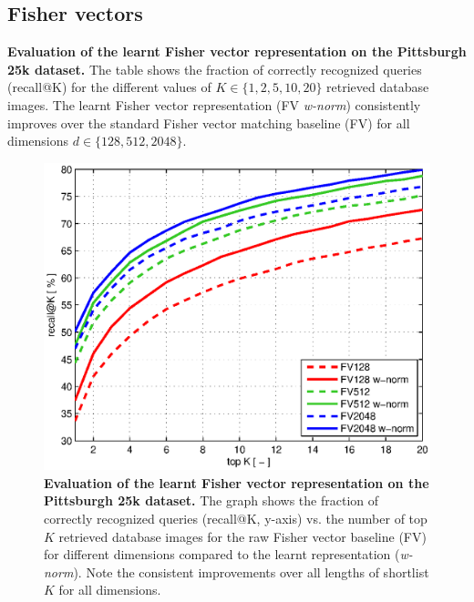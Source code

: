   \subsection{Fisher vectors}
  \label{sec:fisher_restuls}
  
    \begin{table}[tbp]
      \begin{centering}
        
        \caption{ 
          \textbf{Evaluation of the learnt Fisher vector representation on the Pittsburgh 25k \cite{Gronat13} dataset.}
           The table shows the fraction of correctly recognized queries (recall@K) for the different values of $K\in\{1,2,5,10,20\}$ retrieved database images. 
	   The learnt Fisher vector representation (FV \emph{w-norm}) consistently improves over the standard Fisher vector matching baseline (FV) for all dimensions $d\in\{128,512,2048\}$.
        }
        \label{tab:recallFV}
      \end{centering}
    \end{table}

    \begin{figure}[tbp]
        \centering
        \includegraphics[width=1\linewidth]{imgs/plotPitt25kNoBOW}  
        \vspace*{-7mm}
        \caption{
            \textbf{Evaluation of the learnt Fisher vector representation on the Pittsburgh 25k \cite{Gronat13} dataset.} 
            The graph shows the fraction of correctly recognized queries (recall@K, y-axis) vs. the number of top $K$ retrieved database images for the raw Fisher vector baseline (FV) for different dimensions compared to the learnt representation (\emph{w-norm}). Note the consistent improvements over all lengths of shortlist $K$ for all dimensions.
        }
        \label{fig:recall}
    \end{figure}

